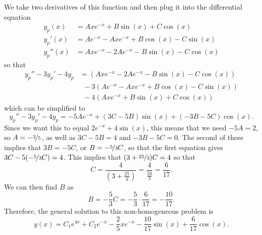 \begin{exampleSol}
We take two derivatives of this function and then plug it into the differential equation
\begin{equation*}
\begin{split}
y_p(x) &= Axe^{-x} + B\sin(x) + C\cos(x) \\
y_p'(x) &= Ae^{-x} - Axe^{-x} + B\cos(x) - C\sin(x) \\
y_p''(x) &= Axe^{-x} - 2Ae^{-x} - B\sin(x) - C\cos(x)
\end{split}
\end{equation*}
so that 
\begin{equation*}
\begin{split}
y_p'' - 3y_p' - 4y_p &= (Axe^{-x} - 2Ae^{-x} - B\sin(x) - C\cos(x))\\
&\ \ - 3(Ae^{-x} - Axe^{-x} + B\cos(x) - C\sin(x))\\
& \ \  - 4(Axe^{-x} + B\sin(x) + C\cos(x))
\end{split}
\end{equation*}
which can be simplified to
\begin{equation*}
y_p'' - 3y_p' - 4y_p = -5Ae^{-x} + (3C - 5B)\sin(x) + (-3B-5C)\cos(x).
\end{equation*}
Since we want this to equal $2e^{-x} + 4\sin(x)$, this means that we need $-5A = 2$, so $A = -\nicefrac{2}{5}$, as well as $3C - 5B = 4$ and $-3B-5C = 0$. The second of these implies that $3B = -5C$, or $B = -\nicefrac{5}{3}C$, so that the first equation gives $3C - 5(-\nicefrac{5}{3}C) = 4$. This implies that $(3 + \nicefrac{25}{3})C = 4$ so that \[ C = \frac{4}{(3 + \frac{25}{3})} = \frac{4}{\frac{34}{3}} = \frac{6}{17}.\] We can then find $B$ as
\[ B = -\frac{5}{3}C = -\frac{5}{3} \cdot \frac{6}{17} = -\frac{10}{17}.\] Therefore, the general solution to this non-homogeneous problem is
\begin{equation*}
y(x) = C_1e^{4x} + C_2e^{-x} - \frac{2}{5}xe^{-x} - \frac{10}{17}\sin(x) + \frac{6}{17}\cos(x).
\end{equation*}


\end{exampleSol}
